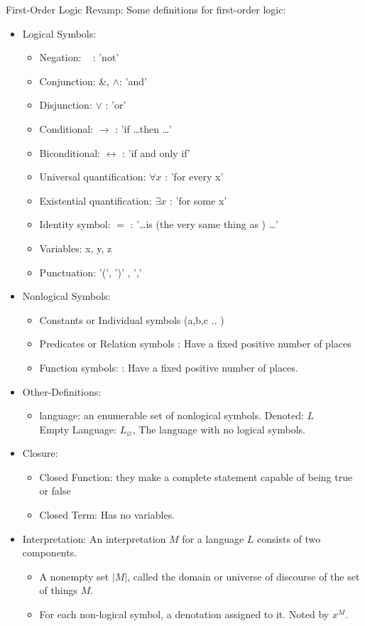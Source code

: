 \large{First-Order Logic Revamp:}
Some definitions for first-order logic: \\
\begin{itemize}
\item Logical Symbols: \\
\begin{itemize} 
\item Negation: ~ : 'not'
\item Conjunction: \&, $\wedge$: 'and'
\item Disjunction: $\vee$ : 'or'
\item Conditional: $\rightarrow$ : 'if \dots then \dots'
\item Biconditional: $\leftrightarrow$ : 'if and only if'
\item Universal quantification: $\forall x$ : 'for every x'
\item Existential quantification: $\exists x$ : 'for some x'
\item Identity symbol: $=$ : '\dots is (the very same thing as ) \dots'
\item Variables: x, y, z
\item Punctuation: '(', ')' , ','
\end{itemize}
\item Nonlogical Symbols:
\begin{itemize}
\item Constants or Individual symbols (a,b,c .. )
\item Predicates or Relation symbols : Have a fixed positive number of places
\item Function symbols: : Have a fixed positive number of places.
\end{itemize}
\item Other-Definitions:
\begin{itemize}
\item language: an enumerable set of nonlogical symbols. Denoted: $L$ \\
Empty Language: $L_\varnothing$, The language with no logical symbols.
\end{itemize} %

\item Closure:
\begin{itemize}
\item Closed Function: they make a complete statement capable of being true or false
\item Closed Term: Has no variables.
\end{itemize}

\item Interpretation: An interpretation $M$ for a language $L$ consists of two components.
\begin{itemize}
\item A nonempty set $|M|$, called the domain or universe of discourse of the set of things $M$.
\item For each non-logical symbol, a denotation assigned to it. Noted by $x^M$.
\end{itemize} %

\end{itemize} %

